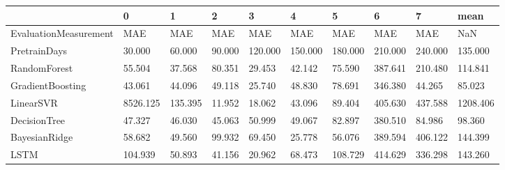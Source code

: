 \begin{tabular}{llllllllll}
\toprule
{} &        0 &       1 &      2 &       3 &       4 &       5 &       6 &       7 &     mean \\
\midrule
EvaluationMeasurement &      MAE &     MAE &    MAE &     MAE &     MAE &     MAE &     MAE &     MAE &      NaN \\
PretrainDays          &   30.000 &  60.000 & 90.000 & 120.000 & 150.000 & 180.000 & 210.000 & 240.000 &  135.000 \\
RandomForest          &   55.504 &  37.568 & 80.351 &  29.453 &  42.142 &  75.590 & 387.641 & 210.480 &  114.841 \\
GradientBoosting      &   43.061 &  44.096 & 49.118 &  25.740 &  48.830 &  78.691 & 346.380 &  44.265 &   85.023 \\
LinearSVR             & 8526.125 & 135.395 & 11.952 &  18.062 &  43.096 &  89.404 & 405.630 & 437.588 & 1208.406 \\
DecisionTree          &   47.327 &  46.030 & 45.063 &  50.999 &  49.067 &  82.897 & 380.510 &  84.986 &   98.360 \\
BayesianRidge         &   58.682 &  49.560 & 99.932 &  69.450 &  25.778 &  56.076 & 389.594 & 406.122 &  144.399 \\
LSTM                  &  104.939 &  50.893 & 41.156 &  20.962 &  68.473 & 108.729 & 414.629 & 336.298 &  143.260 \\
\bottomrule
\end{tabular}
